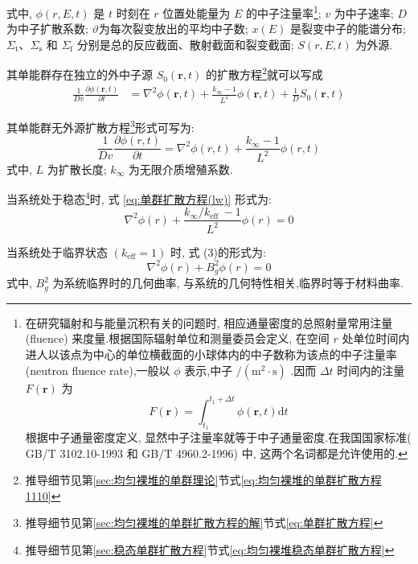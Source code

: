 \documentclass{Sichuan Normal University}
\begin{document}
式中, $\phi(r, E, t)$ 是 $t$ 时刻在 $r$ 位置处能量为 $E$ 的中子注量率\footnote{在研究辐射和与能量沉积有关的问题时, 相应通量密度的总照射量常用注量 (fluence) 来度量.根据国际辐射单位和测量委员会定义, 在空间 $r$ 处单位时间内进人以该点为中心的单位横截面的小球体内的中子数称为该点的中子注量率 (neutron fluence rate),一般以 $\phi$ 表示,中子 $/\left(\mathrm{m}^2 \cdot \mathrm{s}\right)$ .因而 $\Delta t$ 时间内的注量 $F(\boldsymbol{r})$ 为
$$
F(\boldsymbol{r})=\int_{t_1}^{t_1+\Delta t} \phi(\boldsymbol{r}, t) \mathrm{d} t
$$
根据中子通量密度定义, 显然中子注量率就等于中子通量密度.在我国国家标准( GB/T 3102.10-1993 和 GB/T 4960.2-1996) 中, 这两个名词都是允许使用的.}; $v$ 为中子速率; $D$ 为中子扩散系数; $\vartheta$为每次裂变放出的平均中子数; $x(E)$ 是裂变中子的能谱分布; $\Sigma_{\mathrm{t}} 、 \Sigma_{\mathrm{s}}$ 和 $\Sigma_{\mathrm{f}}$ 分别是总的反应截面、散射截面和裂变截面; $S(r, E, t)$ 为外源.

其单能群存在独立的外中子源 $S_0(\boldsymbol{r}, t)$ 的扩散方程\footnote{推导细节见第\ref{sec:均匀裸堆的单群理论}节式\eqref{eq:均匀裸堆的单群扩散方程1110}}就可以写成
\begin{align}
\frac{1}{Dv} \frac{\partial \phi(\boldsymbol{r}, t)}{\partial t}&=\nabla^2 \phi(\boldsymbol{r}, t)+\frac{k_{\infty}-1}{L^2} \phi(\boldsymbol{r}, t)+\frac{1}{D}S_0(\boldsymbol{r}, t)
\label{eq:单群无外源扩散方程}
\end{align}

其单能群无外源扩散方程\footnote{推导细节见第\ref{sec:均匀裸堆的单群扩散方程的解}节式\eqref{eq:单群扩散方程}}形式可写为:
\begin{equation}
\frac{1}{D v} \frac{\partial \phi(r, t)}{\partial t}=\nabla^2 \phi(r, t)+\frac{k_{\infty}-1}{L^2} \phi(r, t)
\label{eq:单群扩散方程(lw)}
\end{equation}
式中, $L$ 为扩散长度; $k_{\infty}$ 为无限介质增殖系数.

当系统处于稳态\footnote{推导细节见第\ref{sec:稳态单群扩散方程}节式\eqref{eq:均匀裸堆稳态单群扩散方程}}时, 式 \eqref{eq:单群扩散方程(lw)} 形式为:
\begin{equation}
\nabla^2 \phi(r)+\frac{k_{\infty} / k_{\text {eff }}-1}{L^2} \phi(r)=0
\label{eq:均匀裸堆稳态单群扩散方程(lw)}
\end{equation}

当系统处于临界状态 $\left(k_{\mathrm{eff}}=1\right)$ 时, 式 (3)的形式为:
\begin{equation}
\nabla^2 \phi(r)+B_g^2 \phi(r)=0
\label{eq:均匀裸堆稳态单群扩散方程2(lw)}
\end{equation}
式中, $B_g^2$ 为系统临界时的几何曲率, 与系统的几何特性相关,临界时等于材料曲率.
\end{document}
